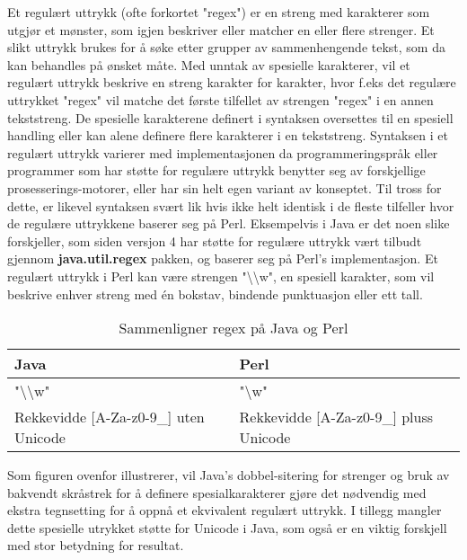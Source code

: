 \documentclass[../main.tex]{subfiles}
\begin{document}
Et regulært uttrykk (ofte forkortet "regex") er en streng med karakterer som utgjør et mønster, som igjen beskriver eller matcher en eller flere strenger.  Et slikt uttrykk brukes for å søke etter grupper av sammenhengende tekst, som da kan behandles på ønsket måte. Med unntak av spesielle karakterer, vil et regulært uttrykk beskrive en streng karakter for karakter, hvor f.eks det regulære uttrykket "regex" vil matche det første tilfellet av strengen "regex" i en annen tekststreng. De spesielle karakterene definert i syntaksen oversettes til en spesiell handling eller kan alene definere flere karakterer i en tekststreng. \newline
Syntaksen i et regulært uttrykk varierer med implementasjonen da programmeringspråk eller programmer som har støtte for regulære uttrykk benytter seg av forskjellige prosesserings-motorer, eller har sin helt egen variant av konseptet. Til tross for dette, er likevel syntaksen svært lik hvis ikke helt identisk i de fleste tilfeller hvor de regulære uttrykkene baserer seg på Perl. Eksempelvis i Java er det noen slike forskjeller, som siden versjon 4 har støtte for regulære uttrykk vært tilbudt gjennom \textbf{java.util.regex} pakken, og baserer seg på Perl’s implementasjon. Et regulært uttrykk i Perl kan være strengen "\textbackslash \textbackslash w", en spesiell karakter, som vil beskrive enhver streng med én bokstav, bindende punktuasjon eller ett tall.

\begin{table}[H]
\begin{center}
\caption{Sammenligner regex på Java og Perl}
  \begin{tabular}{ | p{6cm} | p{6cm} |}
    \hline
    Java & Perl \\ \hline
    "\textbackslash \textbackslash w" & "\textbackslash w" \\ \hline
    Rekkevidde [A-Za-z0-9\_] uten Unicode & Rekkevidde [A-Za-z0-9\_] pluss Unicode \\
    \hline
  \end{tabular}
\end{center}
\end{table}
Som figuren ovenfor illustrerer, vil Java’s dobbel-sitering for strenger og bruk av bakvendt skråstrek for å definere spesialkarakterer gjøre det nødvendig med ekstra tegnsetting for å oppnå et ekvivalent regulært uttrykk. I tillegg mangler dette spesielle utrykket støtte for Unicode i Java, som også er en viktig forskjell med stor betydning for resultat.
\end{document}
